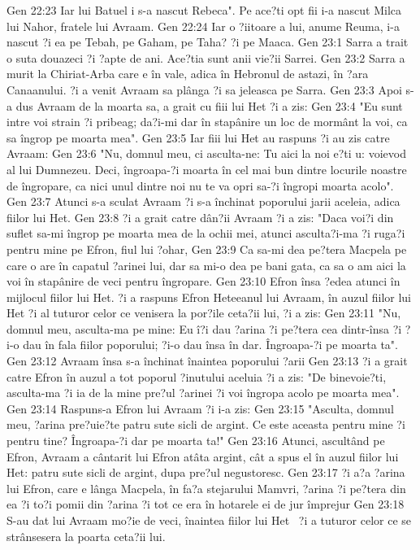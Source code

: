Gen 22:23  Iar lui Batuel i s-a nascut Rebeca". Pe ace?ti opt fii i-a nascut Milca lui Nahor, fratele lui Avraam.
Gen 22:24  Iar o ?iitoare a lui, anume Reuma, i-a nascut ?i ea pe Tebah, pe Gaham, pe Taha? ?i pe Maaca.
Gen 23:1  Sarra a trait o suta douazeci ?i ?apte de ani. Ace?tia sunt anii vie?ii Sarrei.
Gen 23:2  Sarra a murit la Chiriat-Arba care e în vale, adica în Hebronul de astazi, în ?ara Canaanului. ?i a venit Avraam sa plânga ?i sa jeleasca pe Sarra.
Gen 23:3  Apoi s-a dus Avraam de la moarta sa, a grait cu fiii lui Het ?i a zis:
Gen 23:4  "Eu sunt intre voi strain ?i pribeag; da?i-mi dar în stapânire un loc de mormânt la voi, ca sa îngrop pe moarta mea".
Gen 23:5  Iar fiii lui Het au raspuns ?i au zis catre Avraam:
Gen 23:6  "Nu, domnul meu, ci asculta-ne: Tu aici la noi e?ti u: voievod al lui Dumnezeu. Deci, îngroapa-?i moarta în cel mai bun dintre locurile noastre de îngropare, ca nici unul dintre noi nu te va opri sa-?i îngropi moarta acolo".
Gen 23:7  Atunci s-a sculat Avraam ?i s-a închinat poporului jarii aceleia, adica fiilor lui Het.
Gen 23:8  ?i a grait catre dân?ii Avraam ?i a zis: "Daca voi?i din suflet sa-mi îngrop pe moarta mea de la ochii mei, atunci asculta?i-ma ?i ruga?i pentru mine pe Efron, fiul lui ?ohar,
Gen 23:9  Ca sa-mi dea pe?tera Macpela pe care o are în capatul ?arinei lui, dar sa mi-o dea pe bani gata, ca sa o am aici la voi în stapânire de veci pentru îngropare.
Gen 23:10  Efron însa ?edea atunci în mijlocul fiilor lui Het. ?i a raspuns Efron Heteeanul lui Avraam, în auzul fiilor lui Het ?i al tuturor celor ce venisera la por?ile ceta?ii lui, ?i a zis:
Gen 23:11  "Nu, domnul meu, asculta-ma pe mine: Eu î?i dau ?arina ?i pe?tera cea dintr-însa ?i ?i-o dau în fala fiilor poporului; ?i-o dau însa în dar. Îngroapa-?i pe moarta ta".
Gen 23:12  Avraam însa s-a închinat înaintea poporului ?arii
Gen 23:13  ?i a grait catre Efron în auzul a tot poporul ?inutului aceluia ?i a zis: "De binevoie?ti, asculta-ma ?i ia de la mine pre?ul ?arinei ?i voi îngropa acolo pe moarta mea".
Gen 23:14  Raspuns-a Efron lui Avraam ?i i-a zis:
Gen 23:15  "Asculta, domnul meu, ?arina pre?uie?te patru sute sicli de argint. Ce este aceasta pentru mine ?i pentru tine? Îngroapa-?i dar pe moarta ta!"
Gen 23:16  Atunci, ascultând pe Efron, Avraam a cântarit lui Efron atâta argint, cât a spus el în auzul fiilor lui Het: patru sute sicli de argint, dupa pre?ul negustoresc.
Gen 23:17  ?i a?a ?arina lui Efron, care e lânga Macpela, în fa?a stejarului Mamvri, ?arina ?i pe?tera din ea ?i to?i pomii din ?arina ?i tot ce era în hotarele ei de jur împrejur
Gen 23:18  S-au dat lui Avraam mo?ie de veci, înaintea fiilor lui Het  ?i a tuturor celor ce se strânsesera la poarta ceta?ii lui.
